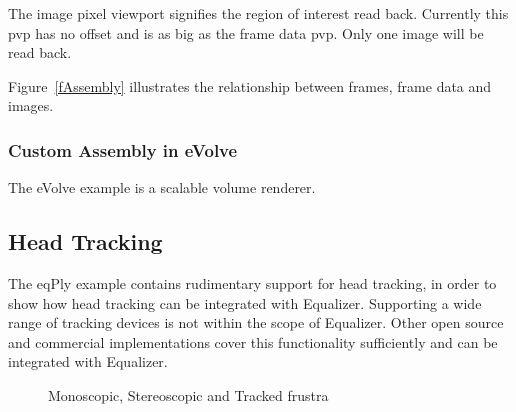 \documentclass[10pt,a4]{scrartcl}
\newcommand{\fig}[1]{Figure~\ref{#1}}
\begin{document}
The image pixel viewport signifies the region of interest read
back. Currently this pvp has no offset and is as big as the frame data
pvp. Only one image will be read back.

\fig{fAssembly} illustrates the relationship between frames, frame data
and images.

\subsubsection{Custom Assembly in eVolve}

The \textsf{eVolve} example is a scalable volume renderer.

\subsection{Head Tracking}

The \textsf{eqPly} example contains rudimentary support for head
tracking, in order to show how head tracking can be integrated with
Equalizer. Supporting a wide range of tracking devices is not within the
scope of Equalizer. Other open source and commercial implementations
cover this functionality sufficiently and can be integrated with
Equalizer.

\begin{figure}[h!t]
  \hfil
  \hfil
  {\caption{\small\label{fImmersive}Monoscopic, Stereoscopic and Tracked
    frustra}}
\end{figure}
\end{document}

